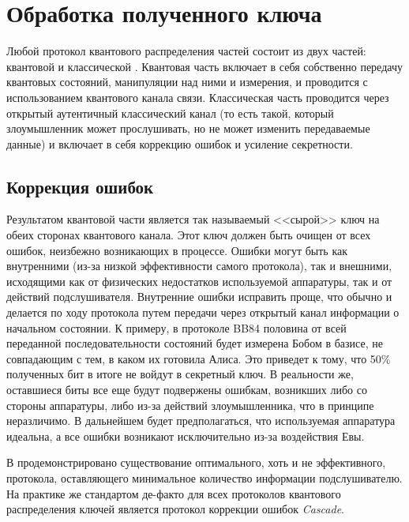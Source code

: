 \section{Обработка полученного ключа}
Любой протокол квантового распределения частей состоит из двух частей: квантовой и классической \cite{gisin2002Quacry}. Квантовая часть включает в себя собственно передачу квантовых состояний, манипуляции над ними и измерения, и проводится с использованием квантового канала связи. Классическая часть проводится через открытый аутентичный классический канал (то есть такой, который злоумышленник может прослушивать, но не может изменить передаваемые данные) и включает в себя коррекцию ошибок и усиление секретности. 

\subsection{Коррекция ошибок}
Результатом квантовой части является так называемый <<сырой>> ключ на обеих сторонах квантового канала. Этот ключ должен быть очищен от всех ошибок, неизбежно возникающих в процессе. Ошибки могут быть как внутренними (из-за низкой эффективности самого протокола), так и внешними, исходящими как от физических недостатков используемой аппаратуры, так и от действий подслушивателя. Внутренние ошибки исправить проще, что обычно и делается по ходу протокола путем передачи через открытый канал информации о начальном состоянии. К примеру, в протоколе BB84\cite{bb84} половина от всей переданной последовательности состояний будет измерена Бобом в базисе, не совпадающим с тем, в каком их готовила Алиса. Это приведет к тому, что 50\% полученных бит в итоге не войдут в секретный ключ. В реальности же, оставшиеся биты все еще будут подвержены ошибкам, возникших либо со стороны аппаратуры, либо из-за действий злоумышленника, что в принципе неразличимо. В дальнейшем будет предполагаться, что используемая аппаратура идеальна, 
а все ошибки возникают исключительно из-за воздействия Евы.

В \cite{information_reconcilation} продемонстрировано существование оптимального, хоть и не эффективного, протокола, оставляющего минимальное количество информации подслушивателю. На практике же стандартом де-факто для всех протоколов квантового распределения ключей является протокол коррекции ошибок \textit{Cascade}.

